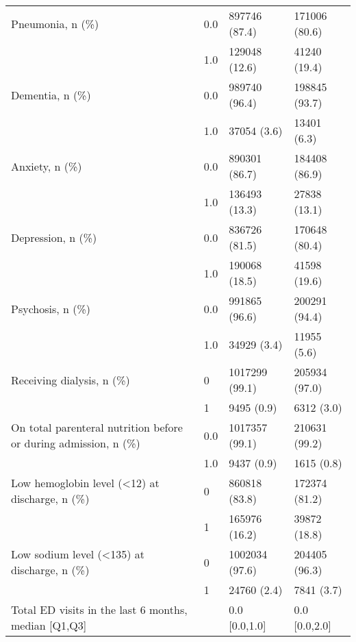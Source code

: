 \begin{tabular}{llll}
Pneumonia, n (\%) & 0.0 &                         897746 (87.4) &     171006 (80.6) \\
                                       & 1.0 &                         129048 (12.6) &      41240 (19.4) \\
Dementia, n (\%) & 0.0 &                         989740 (96.4) &     198845 (93.7) \\
                                       & 1.0 &                           37054 (3.6) &       13401 (6.3) \\
Anxiety, n (\%) & 0.0 &                         890301 (86.7) &     184408 (86.9) \\
                                       & 1.0 &                         136493 (13.3) &      27838 (13.1) \\
Depression, n (\%) & 0.0 &                         836726 (81.5) &     170648 (80.4) \\
                                       & 1.0 &                         190068 (18.5) &      41598 (19.6) \\
Psychosis, n (\%) & 0.0 &                         991865 (96.6) &     200291 (94.4) \\
                                       & 1.0 &                           34929 (3.4) &       11955 (5.6) \\
Receiving dialysis, n (\%) & 0 &                        1017299 (99.1) &     205934 (97.0) \\
                                       & 1 &                            9495 (0.9) &        6312 (3.0) \\
On total parenteral nutrition before or during admission, n (\%) & 0.0 &                        1017357 (99.1) &     210631 (99.2) \\
                                       & 1.0 &                            9437 (0.9) &        1615 (0.8) \\
Low hemoglobin level (<12) at discharge, n (\%) & 0 &                         860818 (83.8) &     172374 (81.2) \\
                                       & 1 &                         165976 (16.2) &      39872 (18.8) \\
Low sodium level (<135) at discharge, n (\%) & 0 &                        1002034 (97.6) &     204405 (96.3) \\
                                       & 1 &                           24760 (2.4) &        7841 (3.7) \\
Total ED visits in the last 6 months, median [Q1,Q3] &   &                         0.0 [0.0,1.0] &     0.0 [0.0,2.0] \\

\end{tabular}

